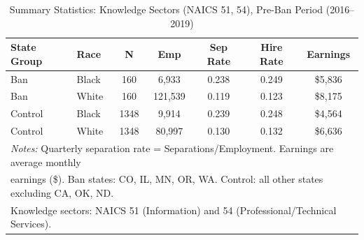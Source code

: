 \begin{table}[t]
\centering
\caption{Summary Statistics: Knowledge Sectors (NAICS 51, 54), Pre-Ban Period (2016--2019)}
\label{tab:summary}
\small
\begin{tabular}{llccccc}
\hline\hline
State Group & Race & N & Emp & Sep Rate & Hire Rate & Earnings \\
\hline
Ban & Black & 160 & 6,933 & 0.238 & 0.249 & \$5,836 \\
Ban & White & 160 & 121,539 & 0.119 & 0.123 & \$8,175 \\
Control & Black & 1348 & 9,914 & 0.239 & 0.248 & \$4,564 \\
Control & White & 1348 & 80,997 & 0.130 & 0.132 & \$6,636 \\
\hline
\multicolumn{7}{l}{\footnotesize \textit{Notes:} Quarterly separation rate = Separations/Employment. Earnings are average monthly}\\
\multicolumn{7}{l}{\footnotesize earnings (\$). Ban states: CO, IL, MN, OR, WA. Control: all other states excluding CA, OK, ND.}\\
\multicolumn{7}{l}{\footnotesize Knowledge sectors: NAICS 51 (Information) and 54 (Professional/Technical Services).}\\
\hline\hline
\end{tabular}
\end{table}
